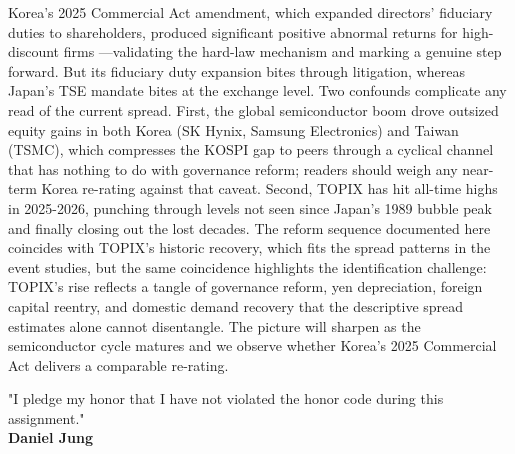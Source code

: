 \documentclass[12pt]{article}
\begin{document}
Korea's 2025 Commercial Act amendment, which expanded directors' fiduciary duties to shareholders, produced significant positive abnormal returns for high-discount firms \citep{kang2026commercial}---validating the hard-law mechanism and marking a genuine step forward. But its fiduciary duty expansion bites through litigation, whereas Japan's TSE mandate bites at the exchange level. Two confounds complicate any read of the current spread. First, the global semiconductor boom drove outsized equity gains in both Korea (SK Hynix, Samsung Electronics) and Taiwan (TSMC), which compresses the KOSPI gap to peers through a cyclical channel that has nothing to do with governance reform; readers should weigh any near-term Korea re-rating against that caveat. Second, TOPIX has hit all-time highs in 2025-2026, punching through levels not seen since Japan's 1989 bubble peak and finally closing out the lost decades. The reform sequence documented here coincides with TOPIX's historic recovery, which fits the spread patterns in the event studies, but the same coincidence highlights the identification challenge: TOPIX's rise reflects a tangle of governance reform, yen depreciation, foreign capital reentry, and domestic demand recovery that the descriptive spread estimates alone cannot disentangle. The picture will sharpen as the semiconductor cycle matures and we observe whether Korea's 2025 Commercial Act delivers a comparable re-rating.

{\singlespacing


}

\begin{center}
    "I pledge my honor that I have not violated the honor code during this assignment."\\
    \vspace{0.5cm}
    \textbf{Daniel Jung}
\end{center}
\end{document}
